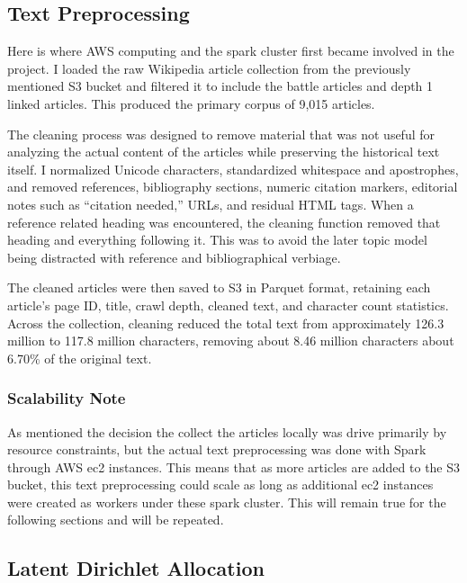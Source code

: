 \documentclass[
  letterpaper,
  DIV=11,
  numbers=noendperiod]{scrartcl}
\begin{document}
\subsection{Text Preprocessing}\label{text-preprocessing}

Here is where AWS computing and the spark cluster first became involved
in the project. I loaded the raw Wikipedia article collection from the
previously mentioned S3 bucket and filtered it to include the battle
articles and depth 1 linked articles. This produced the primary corpus
of 9,015 articles.

The cleaning process was designed to remove material that was not useful
for analyzing the actual content of the articles while preserving the
historical text itself. I normalized Unicode characters, standardized
whitespace and apostrophes, and removed references, bibliography
sections, numeric citation markers, editorial notes such as ``citation
needed,'' URLs, and residual HTML tags. When a reference related heading
was encountered, the cleaning function removed that heading and
everything following it. This was to avoid the later topic model being
distracted with reference and bibliographical verbiage.

The cleaned articles were then saved to S3 in Parquet format, retaining
each article's page ID, title, crawl depth, cleaned text, and character
count statistics. Across the collection, cleaning reduced the total text
from approximately 126.3 million to 117.8 million characters, removing
about 8.46 million characters about 6.70\% of the original text.

\subsubsection{Scalability Note}\label{scalability-note}

As mentioned the decision the collect the articles locally was drive
primarily by resource constraints, but the actual text preprocessing was
done with Spark through AWS ec2 instances. This means that as more
articles are added to the S3 bucket, this text preprocessing could scale
as long as additional ec2 instances were created as workers under these
spark cluster. This will remain true for the following sections and will
be repeated.

\subsection{Latent Dirichlet
Allocation}\label{latent-dirichlet-allocation-1}
\end{document}
